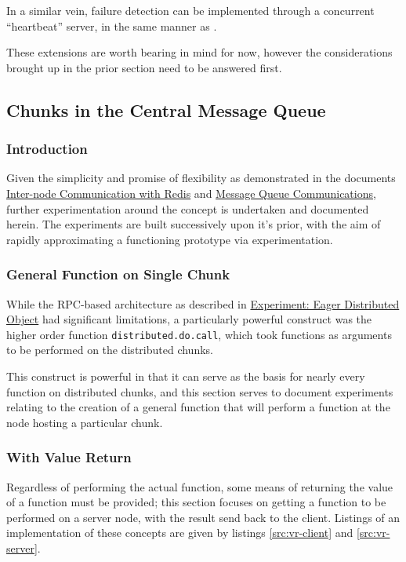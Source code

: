 In a similar vein, failure detection can be implemented through a
concurrent ``heartbeat'' server, in the same manner as 
\cite{white20122adoop}.

These extensions are worth bearing in mind for now, however the
considerations brought up in the prior section need to be answered
first.

\subsection{Chunks in the Central Message Queue}

\subsubsection{Introduction}

Given the simplicity and promise of flexibility as demonstrated in the
documents \href{inter-node-comm-w-redis.pdf}{Inter-node Communication with
Redis} and \href{message-queues-comms.pdf}{Message Queue Communications},
further experimentation around the concept is undertaken and documented herein.
The experiments are built successively upon it's prior, with the aim of rapidly
approximating a functioning prototype via experimentation.

\subsubsection{General Function on Single Chunk}

While the RPC-based architecture as described in
\href{experiment-eager-dist-obj-pre.pdf}{Experiment: Eager Distributed Object}
had significant limitations, a particularly powerful construct was the higher
order function \texttt{distributed.do.call}, which took functions as arguments
to be performed on the distributed chunks.

This construct is powerful in that it can serve as the basis for nearly every
function on distributed chunks, and this section serves to document experiments
relating to the creation of a general function that will perform a function at
the node hosting a particular chunk.

\subsubsection{With Value Return}\label{sec:val-ret}

Regardless of performing the actual function, some means of returning the value
of a function must be provided; this section focuses on getting a function to
be performed on a server node, with the result send back to the client.
Listings of an implementation of these concepts are given by listings
\cref{src:vr-client} and \cref{src:vr-server}.

